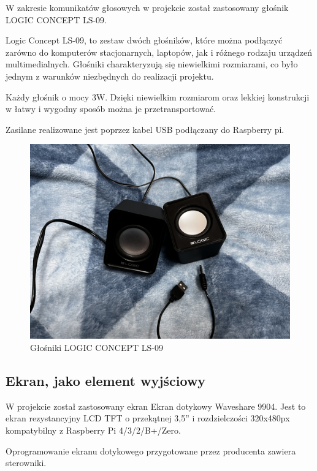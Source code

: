 \documentclass[a4paper,12pt,reqno]{article}
\begin{document}
W zakresie komunikatów głosowych w projekcie został zastosowany głośnik LOGIC CONCEPT LS-09.

Logic Concept LS-09, to zestaw dwóch głośników, które można podłączyć zarówno do komputerów stacjonarnych, laptopów, jak i różnego rodzaju urządzeń multimedialnych. Głośniki charakteryzują się niewielkimi rozmiarami, co było jednym z warunków niezbędnych do realizacji projektu.

Każdy głośnik o mocy 3W. Dzięki niewielkim rozmiarom oraz lekkiej konstrukcji w łatwy i wygodny sposób można je przetransportować.

Zasilane realizowane jest poprzez kabel USB podłączany do Raspberry pi.

\begin{figure}[H]%
\centering
\includegraphics[width=0.8\columnwidth]{imgs/glosnik.jpg}
\caption{Głośniki LOGIC CONCEPT LS-09  \label{glosnik}}
\quad
\end{figure}

\subsection{Ekran, jako element wyjściowy}

W projekcie został zastosowany ekran Ekran dotykowy Waveshare 9904. Jest to ekran rezystancyjny LCD TFT o przekątnej 3,5'' i rozdzielczości 320x480px kompatybilny z Raspberry Pi 4/3/2/B+/Zero.

Oprogramowanie ekranu dotykowego przygotowane przez producenta zawiera sterowniki.
\end{document}
